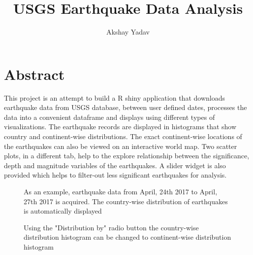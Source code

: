 \documentclass{article}
\date{}
\title{USGS Earthquake Data Analysis}
\author{Akshay Yadav}
\begin{document}
	\maketitle
	\section{Abstract}
		This project is an attempt to build a R shiny application that downloads earthquake data from USGS database, between user defined dates, processes the data into a convenient dataframe and displays using different types of visualizations. The earthquake records are displayed in histograms that show country and continent-wise distributions. The exact continent-wise locations of the earthquakes can also be viewed on an interactive world map. Two scatter plots, in a different tab, help to the explore relationship between the significance, depth and magnitude variables of the earthquakes. A slider widget is also provided which helps to filter-out less significant earthquakes for analysis. 
		
		\begin{figure}
			\caption{As an example, earthquake data from April, 24th 2017 to April, 27th 2017 is acquired. The country-wise distribution of earthquakes is automatically displayed}
		\end{figure}
		
		\begin{figure}
			\caption{Using the "Distribution by" radio button the country-wise distribution histogram can be changed to continent-wise distribution histogram}
		\end{figure}
		
\end{document}
